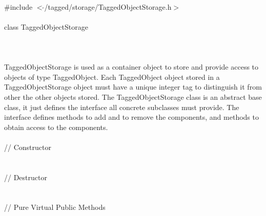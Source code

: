 
   \\
\indent \#include $<\tilde{ }$/tagged/storage/TaggedObjectStorage.h$>$ \\

  \\
\indent class TaggedObjectStorage  \\

 \\
 \\

  \\
\indent TaggedObjectStorage is used as a container object to store and
provide access to objects of type TaggedObject. Each TaggedObject
object stored in a TaggedObjectStorage object must have a unique
integer tag to distinguish it from other the other objects stored. The
TaggedObjectStorage class is an abstract base class, it just defines
the interface all concrete subclasses must provide. The interface
defines methods to add and to remove the components, and methods to
obtain access to the components. \\

  \\
\indent // Constructor  \\
 \\\\
\indent // Destructor \\
 \\  \\
\indent // Pure Virtual Public Methods \\
\\
\\
\\
\\
\\
\\
\\
\\
\\

